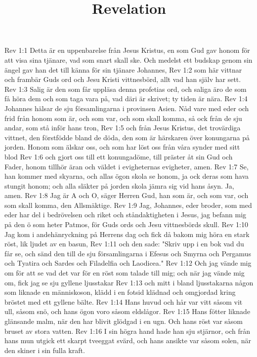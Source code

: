 

\title{Revelation}

Rev 1:1  Detta är en uppenbarelse från Jesus Kristus, en som Gud gav honom för att visa sina tjänare, vad som snart skall ske. Och medelst ett budskap genom sin ängel gav han det till känna för sin tjänare Johannes,
Rev 1:2  som här vittnar och frambär Guds ord och Jesu Kristi vittnesbörd, allt vad han själv har sett.
Rev 1:3  Salig är den som får uppläsa denna profetias ord, och saliga äro de som få höra dem och som taga vara på, vad däri är skrivet; ty tiden är nära.
Rev 1:4  Johannes hälsar de sju församlingarna i provinsen Asien. Nåd vare med eder och frid från honom som är, och som var, och som skall komma, så ock från de sju andar, som stå inför hans tron,
Rev 1:5  och från Jesus Kristus, det trovärdiga vittnet, den förstfödde bland de döda, den som är härskaren över konungarna på jorden. Honom som älskar oss, och som har löst oss från våra synder med sitt blod
Rev 1:6  och gjort oss till ett konungadöme, till präster åt sin Gud och Fader, honom tillhör äran och väldet i evigheternas evigheter, amen.
Rev 1:7  Se, han kommer med skyarna, och allas ögon skola se honom, ja ock deras som hava stungit honom; och alla släkter på jorden skola jämra sig vid hans åsyn. Ja, amen.
Rev 1:8  Jag är A och O, säger Herren Gud, han som är, och som var, och som skall komma, den Allsmäktige.
Rev 1:9  Jag, Johannes, eder broder, som med eder har del i bedrövelsen och riket och ståndaktigheten i Jesus, jag befann mig på den ö som heter Patmos, för Guds ords och Jesu vittnesbörds skull.
Rev 1:10  Jag kom i andehänryckning på Herrens dag och fick då bakom mig höra en stark röst, lik ljudet av en basun,
Rev 1:11  och den sade: "Skriv upp i en bok vad du får se, och sänd den till de sju församlingarna i Efesus och Smyrna och Pergamus och Tyatira och Sardes och Filadelfia och Laodicea."
Rev 1:12  Och jag vände mig om för att se vad det var för en röst som talade till mig; och när jag vände mig om, fick jag se sju gyllene ljusstakar
Rev 1:13  och mitt i bland ljusstakarna någon som liknade en människoson, klädd i en fotsid klädnad och omgjordad kring bröstet med ett gyllene bälte.
Rev 1:14  Hans huvud och hår var vitt såsom vit ull, såsom snö, och hans ögon voro såsom eldslågor.
Rev 1:15  Hans fötter liknade glänsande malm, när den har blivit glödgad i en ugn. Och hans röst var såsom bruset av stora vatten.
Rev 1:16  I sin högra hand hade han sju stjärnor, och från hans mun utgick ett skarpt tveeggat svärd, och hans ansikte var såsom solen, när den skiner i sin fulla kraft.
